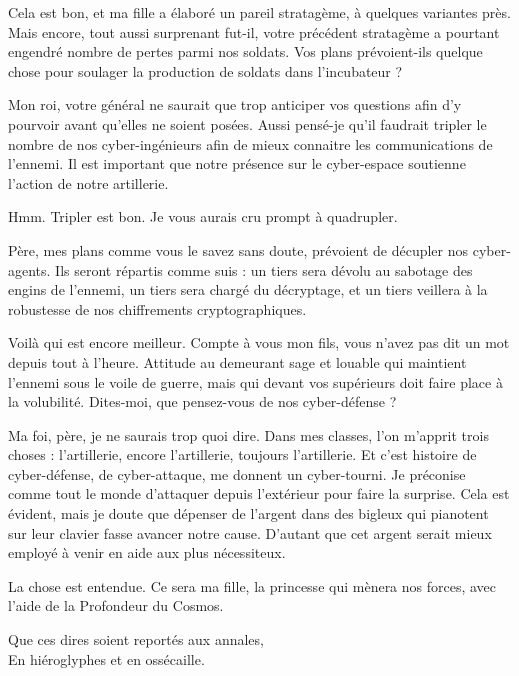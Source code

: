 \begin{drama}
  \roispeaks Cela est bon, et ma fille a élaboré un pareil stratagème, à quelques variantes près. Mais encore, tout aussi surprenant fut-il, votre précédent stratagème a pourtant engendré nombre de pertes parmi nos soldats. Vos plans prévoient-ils quelque chose pour soulager la production de soldats dans l’incubateur ?

  \generalspeaks Mon roi, votre général ne saurait que trop anticiper vos questions afin d’y pourvoir avant qu’elles ne soient posées. Aussi pensé-je qu’il faudrait tripler le nombre de nos cyber-ingénieurs afin de mieux connaitre les communications de l’ennemi. Il est important que notre présence sur le cyber-espace soutienne l’action de notre artillerie.

  \roispeaks Hmm. Tripler est bon. Je vous aurais cru prompt à quadrupler.

  \princessespeaks Père, mes plans comme vous le savez sans doute, prévoient de décupler nos cyber-agents. Ils seront répartis comme suis : un tiers sera dévolu au sabotage des engins de l’ennemi, un tiers sera chargé du décryptage, et un tiers veillera à la robustesse de nos chiffrements cryptographiques.


  \roispeaks Voilà qui est encore meilleur. Compte à vous mon fils, vous n’avez pas dit un mot depuis tout à l’heure. Attitude au demeurant sage et louable qui maintient l’ennemi sous le voile de guerre, mais qui devant vos supérieurs doit faire place à la volubilité. Dites-moi, que pensez-vous de nos cyber-défense ?

  \elenaspeaks Ma foi, père, je ne saurais trop quoi dire. Dans mes classes, l’on m’apprit trois choses : l’artillerie, encore l’artillerie, toujours l’artillerie. Et c’est histoire de cyber-défense, de cyber-attaque, me donnent un cyber-tourni. Je préconise comme tout le monde d’attaquer depuis l’extérieur pour faire la surprise. Cela est évident, mais je doute que dépenser de l’argent dans des bigleux qui pianotent sur leur clavier fasse avancer notre cause. D’autant que cet argent serait mieux employé à venir en aide aux plus nécessiteux.

  \roispeaks La chose est entendue. Ce sera ma fille, la princesse \princesse{} qui mènera nos forces, avec l’aide de la Profondeur du Cosmos.

  \begin{minipage}[t]{\linewidth}
    Que ces dires soient reportés aux annales,\\
    En hiéroglyphes et en ossécaille.
  \end{minipage}


\end{drama}

